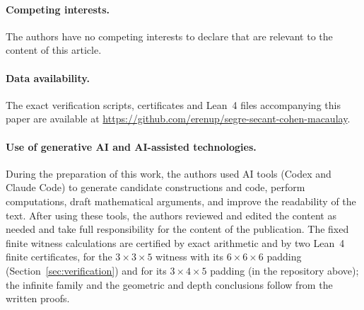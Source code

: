 \documentclass[10pt,a4paper]{article}
\theoremstyle{definition}
\theoremstyle{remark}
\numberwithin{equation}{section}
\begin{document}
\paragraph{Competing interests.}
The authors have no competing interests to declare that are relevant to
the content of this article.

\paragraph{Data availability.}
The exact verification scripts, certificates and Lean~4 files accompanying
this paper are available at
\url{https://github.com/erenup/segre-secant-cohen-macaulay}.

\paragraph{Use of generative AI and AI-assisted technologies.}
During the preparation of this work, the authors used AI tools (Codex and Claude Code) to generate candidate constructions and code, perform computations, draft mathematical arguments, and improve the readability of the text. After using these
tools, the authors reviewed and edited the content as needed and take full
responsibility for the content of the publication. The fixed finite witness calculations are certified by exact arithmetic and by two Lean~4 finite certificates, for the $3\times3\times5$ witness with its $6\times6\times6$ padding (Section~\ref{sec:verification}) and for its $3\times4\times5$ padding (in the repository above); the infinite family and the geometric and depth conclusions follow from the written proofs.



\end{document}
